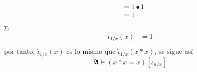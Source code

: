 \documentclass[12pt]{article}
\newcounter{it}
\theoremstyle{largebreak}
\begin{document}
\begin{sol}
\begin{equation*}
\begin{split}
                &=1\bullet 1\\
                &=1\\
            \end{split}
        \end{equation*}
        y,
        \begin{equation*}
            \begin{split}
                \hat{\iota}_{1/x}(x)&=1\\
            \end{split}
        \end{equation*}
        por tanto, $\hat{\iota}_{1/x}(x)$ es lo mismo que $\hat{\iota}_{1/x}(x*x)$, se sigue así
        \begin{equation*}
            \mathfrak{A}\vDash(x*x=x)[\iota_{n/x}]
        \end{equation*}


\end{sol}
\end{document}
